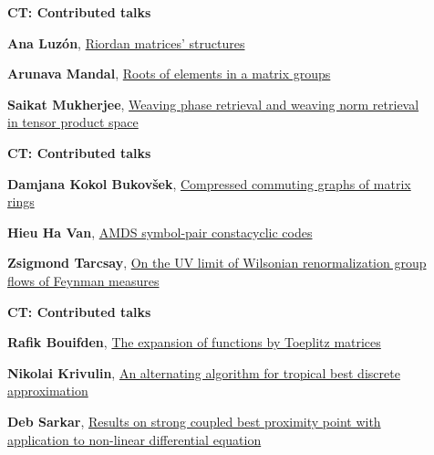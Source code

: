 \documentclass[ILAS2025-program.tex]{subfiles}
\begin{document}
\begin{description}
\begin{description}
        \end{description}
    \begin{description}
    \item[] {\color{mstitle}\textbf{CT: Contributed talks}} 
    \item[] \hypertarget{up0413}{}\textbf{Ana Luzón}, \hyperlink{down0413}{Riordan matrices' structures}
        \item[] \hypertarget{up0414}{}\textbf{Arunava Mandal}, \hyperlink{down0414}{Roots of elements in a matrix groups}
        \item[] \hypertarget{up0415}{}\textbf{Saikat Mukherjee}, \hyperlink{down0415}{Weaving phase retrieval and weaving norm retrieval in tensor product space}
        \end{description}
    \begin{description}
    \item[] {\color{mstitle}\textbf{CT: Contributed talks}} 
    \item[] \hypertarget{up0416}{}\textbf{Damjana Kokol Bukovšek}, \hyperlink{down0416}{Compressed commuting graphs of matrix rings}
        \item[] \hypertarget{up0417}{}\textbf{Hieu Ha Van}, \hyperlink{down0417}{AMDS symbol-pair constacyclic codes}
        \item[] \hypertarget{up0418}{}\textbf{Zsigmond Tarcsay}, \hyperlink{down0418}{On the UV limit of Wilsonian renormalization group flows of Feynman measures}
        \end{description}
    \begin{description}
    \item[] {\color{mstitle}\textbf{CT: Contributed talks}} 
    \item[] \hypertarget{up0419}{}\textbf{Rafik Bouifden}, \hyperlink{down0419}{The expansion of functions by Toeplitz matrices}
        \item[] \hypertarget{up0420}{}\textbf{Nikolai Krivulin}, \hyperlink{down0420}{An alternating algorithm for tropical best discrete approximation}
        \item[] \hypertarget{up0421}{}\textbf{Deb Sarkar}, \hyperlink{down0421}{Results on strong coupled best proximity point with application to non-linear differential equation}

\end{description}
\end{description}
\end{document}
